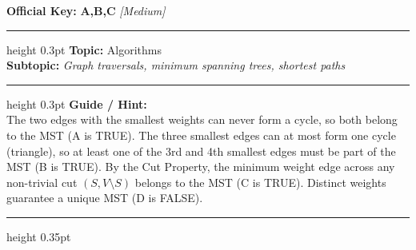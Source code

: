 \documentclass[a4paper,10pt]{article}
\begin{document}
\begin{tcolorbox}
\textbf{Official Key:} \textbf{\large A,B,C} \hfill \textit{\small [Medium]}
\vspace{2pt}\hrule height 0.3pt\vspace{3pt}
\textbf{Topic:} Algorithms \\
\textbf{Subtopic:} \textit{Graph traversals, minimum spanning trees, shortest paths}
\vspace{2pt}\hrule height 0.3pt\vspace{3pt}
\textbf{Guide / Hint:} \\
{\small The two edges with the smallest weights can never form a cycle, so both belong to the MST (A is TRUE). The three smallest edges can at most form one cycle (triangle), so at least one of the 3rd and 4th smallest edges must be part of the MST (B is TRUE). By the Cut Property, the minimum weight edge across any non-trivial cut $(S, V \setminus S)$ belongs to the MST (C is TRUE). Distinct weights guarantee a unique MST (D is FALSE).}

\end{tcolorbox}
\vspace{6pt}\hrule height 0.35pt\vspace{6pt}
\noindent
\end{document}
